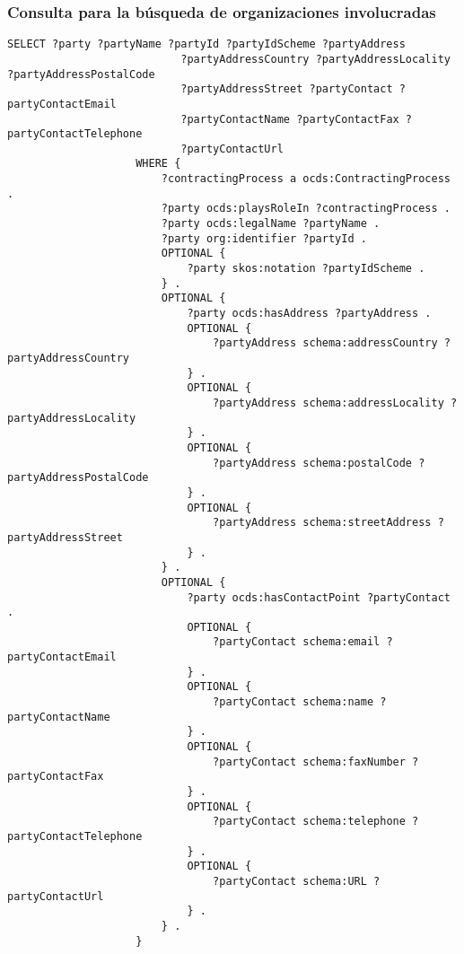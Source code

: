         \subsubsection{Consulta para la búsqueda de organizaciones involucradas}
            \begin{minipage}{\linewidth}
                \begin{lstlisting}[language=lSPARQL]
                    SELECT ?party ?partyName ?partyId ?partyIdScheme ?partyAddress
                           ?partyAddressCountry ?partyAddressLocality ?partyAddressPostalCode 
                           ?partyAddressStreet ?partyContact ?partyContactEmail
                           ?partyContactName ?partyContactFax ?partyContactTelephone 
                           ?partyContactUrl
                    WHERE {
                        ?contractingProcess a ocds:ContractingProcess .
                        ?party ocds:playsRoleIn ?contractingProcess .
                        ?party ocds:legalName ?partyName .
                        ?party org:identifier ?partyId .
                        OPTIONAL {
                            ?party skos:notation ?partyIdScheme .
                        } .
                        OPTIONAL {
                            ?party ocds:hasAddress ?partyAddress .
                            OPTIONAL {
                                ?partyAddress schema:addressCountry ?partyAddressCountry
                            } .
                            OPTIONAL {
                                ?partyAddress schema:addressLocality ?partyAddressLocality
                            } .
                            OPTIONAL {
                                ?partyAddress schema:postalCode ?partyAddressPostalCode
                            } .
                            OPTIONAL {
                                ?partyAddress schema:streetAddress ?partyAddressStreet
                            } .
                        } .
                        OPTIONAL {
                            ?party ocds:hasContactPoint ?partyContact .
                            OPTIONAL {
                                ?partyContact schema:email ?partyContactEmail
                            } .
                            OPTIONAL {
                                ?partyContact schema:name ?partyContactName
                            } .
                            OPTIONAL {
                                ?partyContact schema:faxNumber ?partyContactFax
                            } .
                            OPTIONAL {
                                ?partyContact schema:telephone ?partyContactTelephone
                            } .
                            OPTIONAL {
                                ?partyContact schema:URL ?partyContactUrl
                            } .
                        } .
                    }
                \end{lstlisting}
            \end{minipage}
